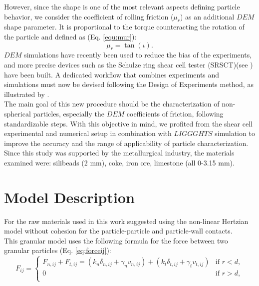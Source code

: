 \documentclass{CFD2015}
\begin{document}
However, since the shape is one of the most relevant aspects defining particle behavior, we consider the coefficient of rolling friction ($\mu_r$) as an additional $DEM$ shape parameter. 
It is proportional to the torque counteracting the rotation of the particle and defined as (Eq. \ref{equ:mur}):
\begin{equation}
 \mu_r =  \tan(\iota) .
\label{equ:mur}
\end{equation}
$DEM $ simulations have recently been used to reduce the bias of the experiments, and more precise devices such as the Schulze ring shear cell tester (SRSCT)(see \citet{RefWorks:104}) have been built.
A dedicated workflow that combines experiments and simulations must now be devised following the Design of Experiments method, as illustrated by \citet{RefWorks:116}.\\
The main goal of this new procedure should be the characterization of non-spherical particles, especially the $DEM$ coefficients of friction, following standardizable steps.
With this objective in mind, we profited from the shear cell experimental and numerical setup in combination with $LIGGGHTS$ simulation to improve the accuracy and the range of applicability of particle characterization.
Since this study was supported by the metallurgical industry, the materials examined were: silibeads (2 mm), coke, iron ore, limestone (all 0-3.15 mm).\\ \label{par:materials}

\section{Model Description}
 \label{sec:modeldesrip}
For the raw materials used in this work \citet{RefWorks:145} suggested using the non-linear Hertzian model without cohesion for the particle-particle and particle-wall contacts.\\
This granular model uses the following formula for the force between two granular particles (Eq. \ref{eq:forceij}):
\small
\begin{equation}
 F_{ij} = 
\begin{cases}
F_{n,ij} + F_{t,ij} = \left( k_n \delta_{n,ij} + \gamma_n v_{n,ij} \right) + \left( k_t \delta_{t,ij} + \gamma_t v_{t,ij} \right) & \text{if } r < d ,\\
0    & \text{if } r > d ,\\
\end{cases}
 \label{eq:forceij}
\end{equation}
\normalsize
\end{document}
